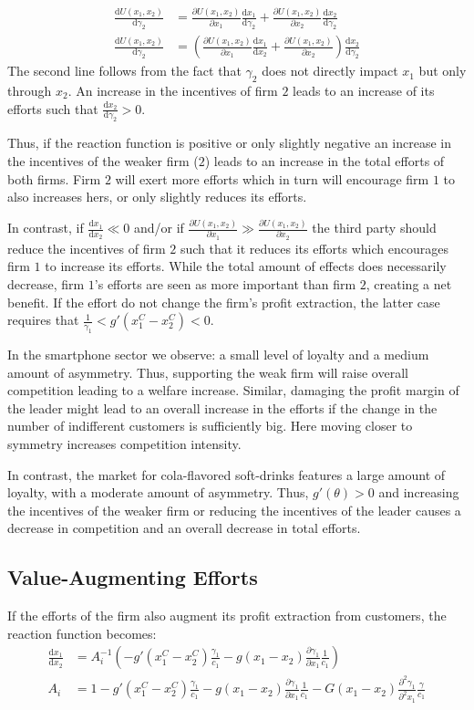 \documentclass[a4paper, 11pt]{article}
\renewcommand{\d}{\text{d}}
\begin{document}
\begin{align}
\frac{\d U(x_1,x_2)}{\d \gamma_2} &= \frac{\partial U(x_1,x_2)}{\partial x_1}\frac{\d x_1}{\d \gamma_2} + \frac{\partial U(x_1,x_2)}{\partial x_2}\frac{\d x_2}{\d \gamma_2}\\
\frac{\d U(x_1,x_2)}{\d \gamma_2} &= \left(\frac{\partial U(x_1,x_2)}{\partial x_1}\frac{\d x_1}{\d x_2}+ \frac{\partial U(x_1,x_2)}{\partial x_2}\right)\frac{\d x_2}{\d \gamma_2}
\end{align}
The second line follows from the fact that $\gamma_2$ does not directly impact $x_1$ but only through $x_2$. An increase in the incentives of firm $2$ leads to an increase of its efforts such that $\frac{\d x_2}{\d \gamma_2}>0$. 

Thus, if the reaction function is positive or only slightly negative an increase in the incentives of the weaker firm ($2$) leads to an increase in the total efforts of both firms. Firm $2$ will exert more efforts which in turn will encourage firm $1$ to also increases hers, or only slightly reduces its efforts. 

In contrast, if $\frac{\d x_1}{\d x_2}\ll0$ and/or if $\frac{\partial U(x_1,x_2)}{\partial x_1}\gg \frac{\partial U(x_1,x_2)}{\partial x_2}$ the third party should reduce the incentives of firm $2$ such that it reduces its efforts which encourages firm $1$ to increase its efforts. While the total amount of effects does necessarily decrease, firm $1$'s efforts are seen as more important than firm $2$, creating a net benefit. If the effort do not change the firm's profit extraction, the latter case requires that $\frac{1}{\gamma_1}<g'(x_1^C-x_2^C)<0$.

In the smartphone sector we observe: a small level of loyalty and a medium amount of asymmetry. Thus, supporting the weak firm will raise overall competition leading to a welfare increase. Similar, damaging the profit margin of the leader might lead to an overall increase in the efforts if the change in the number of indifferent customers is sufficiently big. Here moving closer to symmetry increases competition intensity.

In contrast, the market for cola-flavored soft-drinks features a large amount of loyalty, with a moderate amount of asymmetry. Thus, $g'(\theta)>0$ and increasing the incentives of the weaker firm or reducing the incentives of the leader causes a decrease in competition and an overall decrease in total efforts.

\subsection{Value-Augmenting Efforts}
If the efforts of the firm also augment its profit extraction from customers, the reaction function becomes:
\begin{align}
\frac{\d x_1}{\d x_2} &= A_i^{-1} \left(-g'(x_1^C-x_2^C)\frac{\gamma_1}{c_1} - g(x_1-x_2)\frac{\partial \gamma_1}{\partial x_1}\frac{1}{c_1}\right)\\
A_i &= 1 - g'(x_1^C-x_2^C)\frac{\gamma_1}{c_1}-g(x_1-x_2)\frac{\partial \gamma_1}{\partial x_1}\frac{1}{c_1}-G(x_1-x_2)\frac{\partial^2 \gamma_1}{\partial^2 x_1}\frac{\gamma}{c_1}
\end{align}
\end{document}
